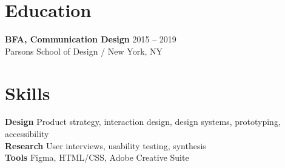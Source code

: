 \documentclass[11pt,a4paper]{article}
\begin{document}
\section{Education}
\textbf{BFA, Communication Design} \hfill 2015 -- 2019\\
Parsons School of Design \enspace / \enspace New York, NY

\section{Skills}
\textbf{Design} \enspace Product strategy, interaction design, design systems,
prototyping, accessibility\\
\textbf{Research} \enspace User interviews, usability testing, synthesis\\
\textbf{Tools} \enspace Figma, HTML/CSS, Adobe Creative Suite
\end{document}
